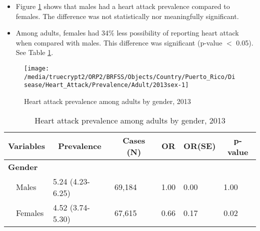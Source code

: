 \newpage
\begin{itemize}

\item Figure \ref{fig:sex.Heart_Attack.2013} shows that males had a 
heart attack prevalence compared to females. The difference was not statistically nor meaningfully significant.


\item Among adults, females had 34\% less possibility of reporting heart attack when compared with males. This difference was significant (p-value $<$ 0.05). See Table \ref{tab:sex.Heart_Attack.2013}.

\end{itemize}

\begin{figure}[H]
\caption{Heart attack prevalence among adults by gender, 
2013}
\begin{knitrout}
\color{fgcolor}

{\centering \texttt{[image: /media/truecrypt2/ORP2/BRFSS/Objects/Country/Puerto\_Rico/Disease/Heart\_Attack/Prevalence/Adult/2013sex-1]} 

}



\end{knitrout}
\label{fig:sex.Heart_Attack.2013}
\end{figure}

\begin{table}[H]
\caption{Heart attack prevalence  among adults by gender, 2013\label{tab:sex.Heart_Attack.2013}} 
\begin{center}
\begin{tabular}{llllll}
\hline\hline
\multicolumn{1}{l}{Variables}&\multicolumn{1}{c}{Prevalence}&\multicolumn{1}{c}{Cases (N)}&\multicolumn{1}{c}{OR}&\multicolumn{1}{c}{OR(SE)}&\multicolumn{1}{c}{p-value}\tabularnewline
\hline
{\bfseries Gender}&&&&&\tabularnewline
~~Males&5.24 (4.23-6.25)&69,184&1.00&0.00&1.00\tabularnewline
~~Females&4.52 (3.74-5.30)&67,615&0.66&0.17&0.02\tabularnewline
\hline
\end{tabular}\end{center}

\end{table}


